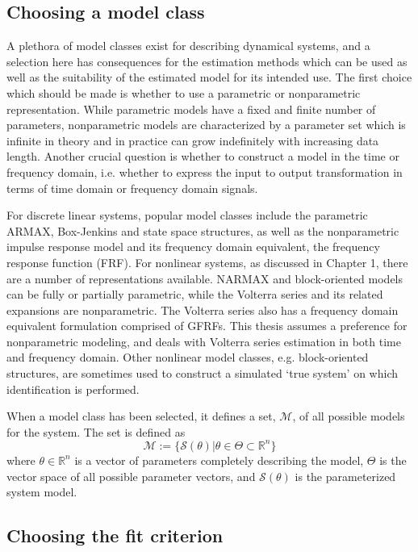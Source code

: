 \subsection{Choosing a model class}

A plethora of model classes exist for describing dynamical systems, and a selection here has consequences for the estimation methods which can be used as well as the suitability of the estimated model for its intended use. The first choice which should be made is whether to use a parametric or nonparametric representation. While parametric models have a fixed and finite number of parameters, nonparametric models are characterized by a parameter set which is infinite in theory and in practice can grow indefinitely with increasing data length. Another crucial question is whether to construct a model in the time or frequency domain, i.e. whether to express the input to output transformation in terms of time domain or frequency domain signals.

For discrete linear systems, popular model classes include the parametric ARMAX, Box-Jenkins and state space structures, as well as the nonparametric impulse response model and its frequency domain equivalent, the frequency response function (FRF). For nonlinear systems, as discussed in Chapter 1, there are a number of representations available. NARMAX and block-oriented models can be fully or partially parametric, while the Volterra series and its related expansions are nonparametric. The Volterra series also has a frequency domain equivalent formulation comprised of GFRFs. This thesis assumes a preference for nonparametric modeling, and deals with Volterra series estimation in both time and frequency domain. Other nonlinear model classes, e.g. block-oriented structures, are sometimes used to construct a simulated `true system' on which identification is performed.

When a model class has been selected, it defines a set, $\mathcal{M}$, of all possible models for the system. The set is defined as
\begin{equation}
\mathcal{M} := \{ \mathcal{S}(\theta) | \theta \in \Theta \subset \mathbb{R}^n \}
\end{equation}
where $\theta \in \mathbb{R}^n$ is a vector of parameters completely describing the model, $\Theta$ is the vector space of all possible parameter vectors, and $\mathcal{S}(\theta)$ is the parameterized system model.


\subsection{Choosing the fit criterion}

